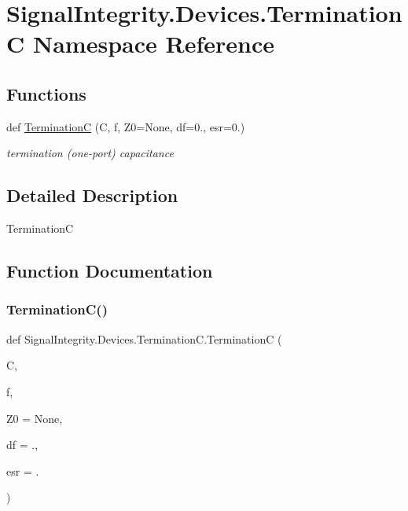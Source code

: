 \hypertarget{namespaceSignalIntegrity_1_1Devices_1_1TerminationC}{}\section{Signal\+Integrity.\+Devices.\+TerminationC Namespace Reference}
\label{namespaceSignalIntegrity_1_1Devices_1_1TerminationC}
\subsection*{Functions}
\begin{DoxyCompactItemize}
\item 
def \hyperlink{namespaceSignalIntegrity_1_1Devices_1_1TerminationC_a199df58c7908ce4f7f7dbc0ccfbc2a37}{TerminationC} (C, f, Z0=None, df=0., esr=0.)
\begin{DoxyCompactList}\small\item\em termination (one-\/port) capacitance \end{DoxyCompactList}\end{DoxyCompactItemize}


\subsection{Detailed Description}
\begin{DoxyVerb}TerminationC\end{DoxyVerb}
 

\subsection{Function Documentation}
\mbox{\label{namespaceSignalIntegrity_1_1Devices_1_1TerminationC_a199df58c7908ce4f7f7dbc0ccfbc2a37}} 
\subsubsection{\texorpdfstring{Termination\+C()}{TerminationC()}}
{\footnotesize\ttfamily def Signal\+Integrity.\+Devices.\+Termination\+C.\+TerminationC (\begin{DoxyParamCaption}\item[{}]{C,  }\item[{}]{f,  }\item[{}]{Z0 = {\ttfamily None},  }\item[{}]{df = {.},  }\item[{}]{esr = {.} }\end{DoxyParamCaption})}




